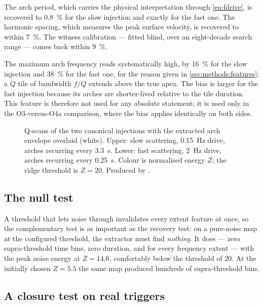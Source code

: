 The arch period, which carries the physical interpretation through
\cref{eq:fdrive}, is recovered to \SI{0.8}{\percent} for the slow injection and
exactly for the fast one. The harmonic spacing, which measures the peak
surface velocity, is recovered to within \SI{7}{\percent}. The witness
calibration --- fitted blind, over an eight-decade search range --- comes back
within \SI{9}{\percent}.

The maximum arch frequency reads systematically high, by \SI{16}{\percent} for
the slow injection and \SI{38}{\percent} for the fast one, for the reason given
in \cref{sec:methods:features}: a $Q$ tile of bandwidth $f/Q$ extends above
the true apex. The bias is larger for the fast injection because its arches
are shorter-lived relative to the tile duration. This feature is therefore not
used for any absolute statement; it is used only in the O3-versus-O4a
comparison, where the bias applies identically on both sides.

\begin{figure}[htbp]
\centering
{}
\caption{Q-scans of the two canonical injections with the extracted arch
envelope overlaid (white). Upper: slow scattering, \SI{0.15}{\hertz} drive,
arches recurring every \SI{3.3}{\second}. Lower: fast scattering,
\SI{2}{\hertz} drive, arches recurring every \SI{0.25}{\second}. Colour is
normalised energy $Z$; the ridge threshold is $Z = 20$. Produced by
.}
\label{fig:validation}
\end{figure}

\subsection{The null test}

A threshold that lets noise through invalidates every extent feature at once,
so the complementary test is as important as the recovery test: on a
pure-noise map at the configured threshold, the extractor must find
\emph{nothing}. It does --- zero supra-threshold time bins, zero duration, and
 for every frequency extent --- with the peak noise energy at
$Z = 14.6$, comfortably below the threshold of $20$. At the initially chosen
$Z = 5.5$ the same map produced hundreds of supra-threshold bins.

\subsection{A closure test on real triggers}
\label{sec:validation:closure}

